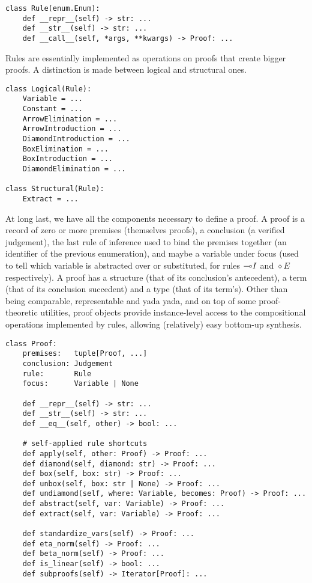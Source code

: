 \begin{verbatim}
class Rule(enum.Enum):
    def __repr__(self) -> str: ...
    def __str__(self) -> str: ...
    def __call__(self, *args, **kwargs) -> Proof: ...
\end{verbatim}

Rules are essentially implemented as operations on proofs that create bigger proofs.
A distinction is made between logical and structural ones.

\begin{verbatim}
class Logical(Rule):
    Variable = ...
    Constant = ...
    ArrowElimination = ...
    ArrowIntroduction = ...
    DiamondIntroduction = ...
    BoxElimination = ...
    BoxIntroduction = ...
    DiamondElimination = ...

class Structural(Rule):
    Extract = ...
\end{verbatim}

\noindent At long last, we have all the components necessary to define a proof.
A proof is a record of zero or more premises (themselves proofs), a conclusion (a verified judgement), the last rule of inference used to bind the premises together (an identifier of the previous enumeration), and maybe a variable under focus (used to tell which variable is abstracted over or substituted, for rules $\li I$ and $\diamond E$ respectively).
A proof has a structure (that of its conclusion's antecedent), a term (that of its conclusion succedent) and a type (that of its term's).
Other than being comparable, representable and yada yada, and on top of some proof-theoretic utilities, proof objects provide instance-level access to the compositional operations implemented by rules, allowing (relatively) easy bottom-up synthesis.

\begin{verbatim}
class Proof:
    premises:   tuple[Proof, ...]
    conclusion: Judgement
    rule:       Rule
    focus:      Variable | None
    
    def __repr__(self) -> str: ...
    def __str__(self) -> str: ...
    def __eq__(self, other) -> bool: ...
    
    # self-applied rule shortcuts
    def apply(self, other: Proof) -> Proof: ...
    def diamond(self, diamond: str) -> Proof: ...
    def box(self, box: str) -> Proof: ...
    def unbox(self, box: str | None) -> Proof: ...
    def undiamond(self, where: Variable, becomes: Proof) -> Proof: ... 
    def abstract(self, var: Variable) -> Proof: ...
    def extract(self, var: Variable) -> Proof: ...

    def standardize_vars(self) -> Proof: ...
    def eta_norm(self) -> Proof: ...
    def beta_norm(self) -> Proof: ...
    def is_linear(self) -> bool: ...
    def subproofs(self) -> Iterator[Proof]: ...

\end{verbatim}

